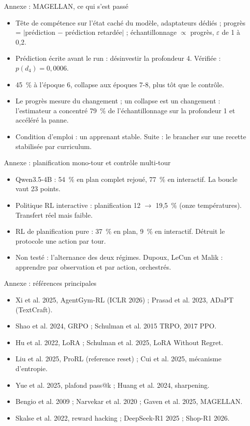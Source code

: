 \documentclass[aspectratio=169,11pt]{beamer}
\begin{document}
\begin{frame}{Annexe : MAGELLAN, ce qui s'est passé}
\begin{itemize}
    \item Tête de compétence sur l'état caché du modèle, adaptateurs dédiés ; progrès = $|$prédiction $-$ prédiction retardée$|$ ; échantillonnage $\propto$ progrès, $\varepsilon$ de 1 à 0,2.
    \item Prédiction écrite avant le run : désinvestir la profondeur 4. Vérifiée : $p(d_4)=0{,}0006$.
    \item 45~\% à l'époque 6, collapse aux époques 7-8, plus tôt que le contrôle.
    \item Le progrès mesure du changement ; un collapse est un changement : l'estimateur a concentré 79~\% de l'échantillonnage sur la profondeur 1 et accéléré la panne.
    \item Condition d'emploi : un apprenant stable. Suite : le brancher sur une recette stabilisée par curriculum.
\end{itemize}
\end{frame}

\begin{frame}{Annexe : planification mono-tour et contrôle multi-tour}
\begin{itemize}
    \item Qwen3.5-4B : 54~\% en plan complet rejoué, 77~\% en interactif. La boucle vaut 23 points.
    \item Politique RL interactive : planification 12 $\to$ 19,5~\% (onze températures). Transfert réel mais faible.
    \item RL de planification pure : 37~\% en plan, 9~\% en interactif. Détruit le protocole une action par tour.
    \item Non testé : l'alternance des deux régimes. Dupoux, LeCun et Malik : apprendre par observation et par action, orchestrés.
\end{itemize}
\end{frame}

\begin{frame}{Annexe : références principales}
\small
\begin{itemize}
    \item Xi et al. 2025, AgentGym-RL (ICLR 2026) ; Prasad et al. 2023, ADaPT (TextCraft).
    \item Shao et al. 2024, GRPO ; Schulman et al. 2015 TRPO, 2017 PPO.
    \item Hu et al. 2022, LoRA ; Schulman et al. 2025, LoRA Without Regret.
    \item Liu et al. 2025, ProRL (reference reset) ; Cui et al. 2025, mécanisme d'entropie.
    \item Yue et al. 2025, plafond pass@k ; Huang et al. 2024, sharpening.
    \item Bengio et al. 2009 ; Narvekar et al. 2020 ; Gaven et al. 2025, MAGELLAN.
    \item Skalse et al. 2022, reward hacking ; DeepSeek-R1 2025 ; Shop-R1 2026.
\end{itemize}
\end{frame}
\end{document}
